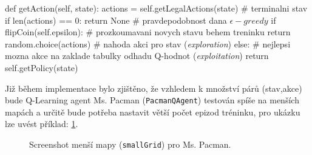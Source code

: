 \begin{python}[label={code:qpolicy}]
def getAction(self, state):
   actions = self.getLegalActions(state)
   # terminalni stav
   if len(actions) == 0:
      return None
   # pravdepodobnost dana $\epsilon-greedy$ 
   if flipCoin(self.epsilon):
      # prozkoumavani novych stavu behem treninku
      return random.choice(actions) # nahoda akci pro stav (\textit{exploration})
   else:
      # nejlepsi mozna akce na zaklade tabulky odhadu Q-hodnot (\textit{exploitation})
      return self.getPolicy(state)
\end{python}

Již během implementace bylo zjištěno, že vzhledem k množství párů (stav,akce) bude Q-Learning agent Ms. Pacman (\texttt{PacmanQAgent}) testován spíše na menších mapách a určitě bude potřeba nastavit větší počet epizod tréninku, pro ukázku lze uvést příklad: \ref{img:smallL}.
\begin{figure}[!htbp]
\begin{center}
  \caption{Screenshot menší mapy (\texttt{smallGrid}) pro Ms. Pacman.}
  \label{img:smallL}
\end{center}
\end{figure}

